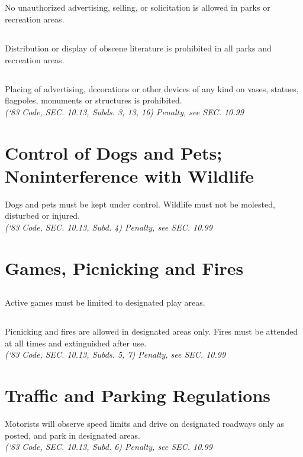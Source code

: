 \documentclass[code.tex]{subfiles}
\begin{document}
\subsection{}
No unauthorized advertising, selling, or solicitation is allowed in parks or recreation areas.
\subsection{}
Distribution or display of obscene literature is prohibited in all parks and recreation areas.
\subsection{}
Placing of advertising, decorations or other devices of any kind on vases, statues, flagpoles, monuments or structures is prohibited.\\
\emph{(‘83 Code, SEC. 10.13, Subds. 3, 13, 16)  Penalty, see SEC. 10.99}
\section{Control of Dogs and Pets; Noninterference with Wildlife}
Dogs and pets must be kept under control.  Wildlife must not be molested, disturbed or injured.\\
\emph{(‘83 Code, SEC. 10.13, Subd. 4)  Penalty, see SEC. 10.99}
\section{Games, Picnicking and Fires}
\subsection{}
Active games must be limited to designated play areas.
\subsection{}
Picnicking and fires are allowed in designated areas only.  Fires must be attended at all times and extinguished after use.\\
\emph{(‘83 Code, SEC. 10.13, Subds. 5, 7)  Penalty, see SEC. 10.99}
\section{Traffic and Parking Regulations}
Motorists will observe speed limits and drive on designated roadways only as posted, and park in designated areas.\\
\emph{(‘83 Code, SEC. 10.13, Subd. 6)  Penalty, see SEC. 10.99}
\end{document}
